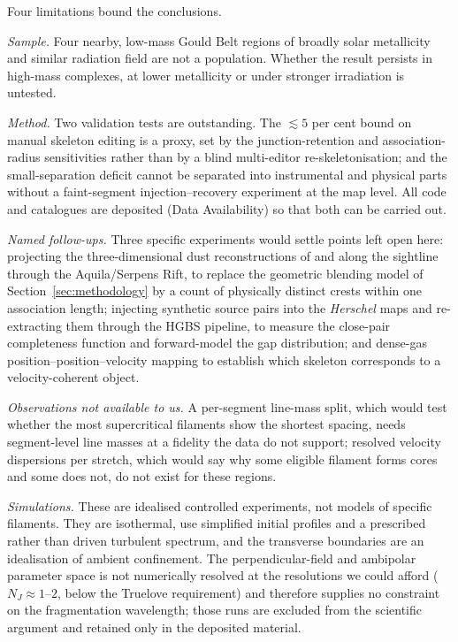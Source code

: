 \documentclass[usenatbib,twoside,twocolumn]{mnras}
\begin{document}
Four limitations bound the conclusions.

\emph{Sample.} Four nearby, low-mass Gould Belt regions of broadly solar metallicity and similar radiation field are not a population. Whether the result persists in high-mass complexes, at lower metallicity or under stronger irradiation is untested.

\emph{Method.} Two validation tests are outstanding. The $\lesssim5$ per cent bound on manual skeleton editing is a proxy, set by the junction-retention and association-radius sensitivities rather than by a blind multi-editor re-skeletonisation; and the small-separation deficit cannot be separated into instrumental and physical parts without a faint-segment injection--recovery experiment at the map level. All code and catalogues are deposited (Data Availability) so that both can be carried out.

\emph{Named follow-ups.} Three specific experiments would settle points left open here: projecting the three-dimensional dust reconstructions of \citet{Zucker2020} and \citet{Green2024} along the sightline through the Aquila/Serpens Rift, to replace the geometric blending model of Section~\ref{sec:methodology} by a count of physically distinct crests within one association length; injecting synthetic source pairs into the \textit{Herschel} maps and re-extracting them through the HGBS pipeline, to measure the close-pair completeness function and forward-model the gap distribution; and dense-gas position--position--velocity mapping to establish which skeleton corresponds to a velocity-coherent object.

\emph{Observations not available to us.} A per-segment line-mass split, which would test whether the most supercritical filaments show the shortest spacing, needs segment-level line masses at a fidelity the data do not support; resolved velocity dispersions per stretch, which would say why some eligible filament forms cores and some does not, do not exist for these regions.

\emph{Simulations.} These are idealised controlled experiments, not models of specific filaments. They are isothermal, use simplified initial profiles and a prescribed rather than driven turbulent spectrum, and the transverse boundaries are an idealisation of ambient confinement. The perpendicular-field and ambipolar parameter space is not numerically resolved at the resolutions we could afford ($N_J\approx1$--$2$, below the Truelove requirement) and therefore supplies no constraint on the fragmentation wavelength; those runs are excluded from the scientific argument and retained only in the deposited material.
\end{document}
